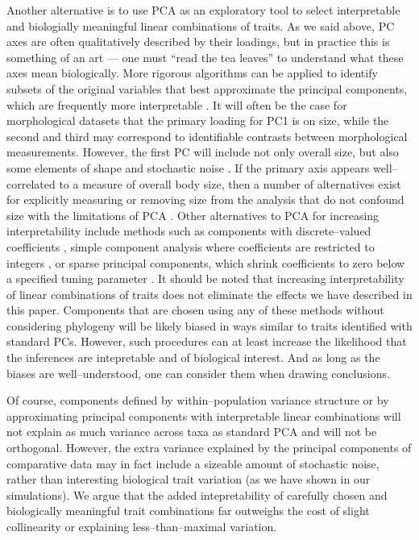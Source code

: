 \documentclass[a4paper,12pt]{article}
\begin{document}
Another alternative is to use PCA as an exploratory tool to select interpretable and biologially meaningful linear combinations of traits. As we said above, PC axes are often qualitatively described by their loadings, but in practice this is something of an art --- one must ``read the tea leaves'' to understand what these axes mean biologically. More rigorous algorithms can be applied to identify subsets of the original variables that best approximate the principal components, which are frequently more interpretable \citep{Cadima2001}. It will often be the case for morphological datasets that the primary loading for PC1 is on size, while the second and third may correspond to identifiable contrasts between morphological measurements. However, the first PC will include not only overall size, but also some elements of shape and stochastic noise \citep{Somers1986, Somers1989}. If the primary axis appears well--correlated to a measure of overall body size, then a number of alternatives exist for explicitly measuring or removing size from the analysis that do not confound size with the limitations of PCA \citep{Somers1989}. Other alternatives to PCA for increasing interpretability include methods such as components with discrete--valued coefficients \citep{Hausman1982}, simple component analysis where coefficients are restricted to integers \citep{Vines2000}, or sparse principal components, which shrink coefficients to zero below a specified tuning parameter \citep{Jolliffe2002, Zou2006}. It should be noted that increasing interpretability of linear combinations of traits does not eliminate the effects we have described in this paper. Components that are chosen using any of these methods without considering phylogeny will be likely biased in ways similar to traits identified with standard PCs. However, such procedures can at least increase the likelihood that the inferences are intepretable and of biological interest. And as long as the biases are well--understood, one can consider them when drawing conclusions.  

Of course, components defined by within--population variance structure or by approximating principal components with interpretable linear combinations will not explain as much variance across taxa as standard PCA and will not be orthogonal. However, the extra variance explained by the principal components of comparative data may in fact include a sizeable amount of stochastic noise, rather than interesting biological trait variation (as we have shown in our simulations). We argue that the added intepretability of carefully chosen and biologically meaningful trait combinations far outweighs the cost of slight collinearity or explaining less--than--maximal variation.
\end{document}
